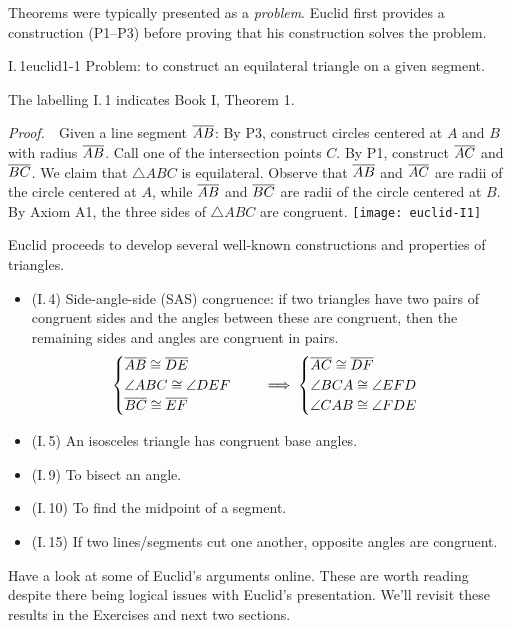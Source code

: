 
Theorems were typically presented as a \emph{problem}. Euclid first provides a construction (P1--P3) before proving that his construction solves the problem.

\begin{thm}{I.\,1}{euclid1-1}
	Problem: to construct an equilateral triangle on a given segment.
\end{thm}

The labelling I.\,1 indicates Book I, Theorem 1.

\begin{tcolorbox}[proofstyle, lower separated=false, sidebyside, sidebyside align=top seam, sidebyside gap=0pt, righthand width=0.35\linewidth]
	\emph{Proof.}\ \ Given a line segment $\overline{AB}$:\smallbreak
	By P3, construct circles centered at $A$ and $B$ with radius $\overline{AB}$.\smallbreak
	Call one of the intersection points $C$. By P1, construct $\overline{AC}$ and $\overline{BC}$.\smallbreak
	We claim that $\triangle ABC$ is equilateral.\medbreak
	Observe that $\overline{AB}$ and $\overline{AC}$ are radii of the circle centered at $A$, while $\overline{AB}$ and $\overline{BC}$ are radii of the circle centered at $B$. By Axiom A1, the three sides of $\triangle ABC$ are congruent.
	\tcblower
	\flushright\texttt{[image: euclid-I1]}\hfil\qedsymbol
\end{tcolorbox}


Euclid proceeds to develop several well-known constructions and properties of triangles.
\begin{itemize}\itemsep0pt
  \item (I.\,4) Side-angle-side (SAS) congruence: if two triangles have two pairs of congruent sides and the angles between these are congruent, then the remaining sides and angles are congruent in pairs.
  \[
  	\begin{cases}
		  \overline{AB}\cong\overline{DE}\\
		  \angle ABC\cong\angle DEF\\
		  \overline{BC}\cong\overline{EF}
 	 	\end{cases}
  	\quad\implies
  	\begin{cases}
		  \overline{AC}\cong\overline{DF}\\
		  \angle BCA\cong\angle EFD\\
		  \angle CAB\cong\angle FDE
  	\end{cases}
  \]
  \item (I.\,5) An isosceles triangle has congruent base angles.
  \item (I.\,9) To bisect an angle.
  \item (I.\,10) To find the midpoint of a segment.
  \item (I.\,15) If two lines/segments cut one another, opposite angles are congruent.
\end{itemize}
Have a look at some of Euclid's arguments online. These are worth reading despite there being logical issues with Euclid's presentation. We'll revisit these results in the Exercises and next two sections. 

